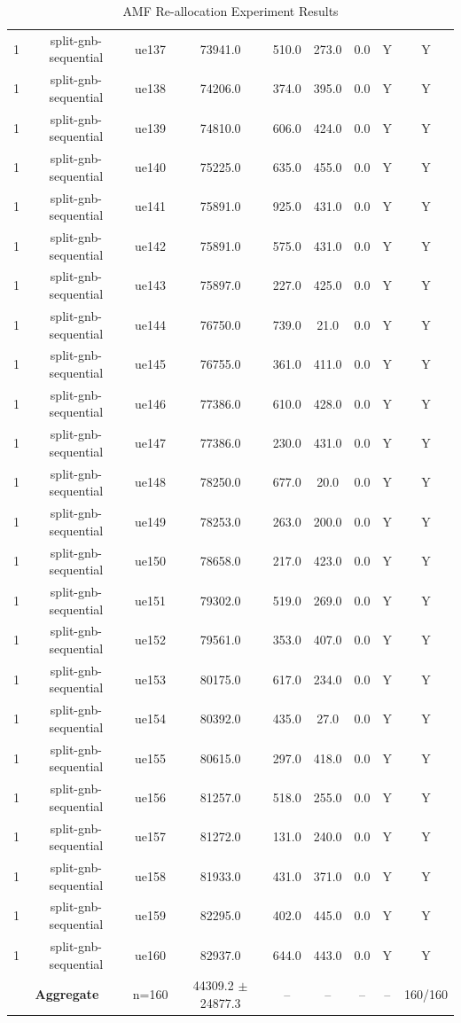 \begin{table}[ht]
\begin{tabular}{|c|c|c|c|c|c|c|c|c|}
1 & split-gnb-sequential & ue137 & 73941.0 & 510.0 & 273.0 & 0.0 & Y & Y \\
1 & split-gnb-sequential & ue138 & 74206.0 & 374.0 & 395.0 & 0.0 & Y & Y \\
1 & split-gnb-sequential & ue139 & 74810.0 & 606.0 & 424.0 & 0.0 & Y & Y \\
1 & split-gnb-sequential & ue140 & 75225.0 & 635.0 & 455.0 & 0.0 & Y & Y \\
1 & split-gnb-sequential & ue141 & 75891.0 & 925.0 & 431.0 & 0.0 & Y & Y \\
1 & split-gnb-sequential & ue142 & 75891.0 & 575.0 & 431.0 & 0.0 & Y & Y \\
1 & split-gnb-sequential & ue143 & 75897.0 & 227.0 & 425.0 & 0.0 & Y & Y \\
1 & split-gnb-sequential & ue144 & 76750.0 & 739.0 & 21.0 & 0.0 & Y & Y \\
1 & split-gnb-sequential & ue145 & 76755.0 & 361.0 & 411.0 & 0.0 & Y & Y \\
1 & split-gnb-sequential & ue146 & 77386.0 & 610.0 & 428.0 & 0.0 & Y & Y \\
1 & split-gnb-sequential & ue147 & 77386.0 & 230.0 & 431.0 & 0.0 & Y & Y \\
1 & split-gnb-sequential & ue148 & 78250.0 & 677.0 & 20.0 & 0.0 & Y & Y \\
1 & split-gnb-sequential & ue149 & 78253.0 & 263.0 & 200.0 & 0.0 & Y & Y \\
1 & split-gnb-sequential & ue150 & 78658.0 & 217.0 & 423.0 & 0.0 & Y & Y \\
1 & split-gnb-sequential & ue151 & 79302.0 & 519.0 & 269.0 & 0.0 & Y & Y \\
1 & split-gnb-sequential & ue152 & 79561.0 & 353.0 & 407.0 & 0.0 & Y & Y \\
1 & split-gnb-sequential & ue153 & 80175.0 & 617.0 & 234.0 & 0.0 & Y & Y \\
1 & split-gnb-sequential & ue154 & 80392.0 & 435.0 & 27.0 & 0.0 & Y & Y \\
1 & split-gnb-sequential & ue155 & 80615.0 & 297.0 & 418.0 & 0.0 & Y & Y \\
1 & split-gnb-sequential & ue156 & 81257.0 & 518.0 & 255.0 & 0.0 & Y & Y \\
1 & split-gnb-sequential & ue157 & 81272.0 & 131.0 & 240.0 & 0.0 & Y & Y \\
1 & split-gnb-sequential & ue158 & 81933.0 & 431.0 & 371.0 & 0.0 & Y & Y \\
1 & split-gnb-sequential & ue159 & 82295.0 & 402.0 & 445.0 & 0.0 & Y & Y \\
1 & split-gnb-sequential & ue160 & 82937.0 & 644.0 & 443.0 & 0.0 & Y & Y \\
\multicolumn{2}{|c|}{\textbf{Aggregate}} & n=160 & 44309.2 $\pm$ 24877.3 & -- & -- & -- & -- & 160/160 \\
\hline
\end{tabular}
\caption{AMF Re-allocation Experiment Results}
\label{tab:amf_realloc}
\end{table}
